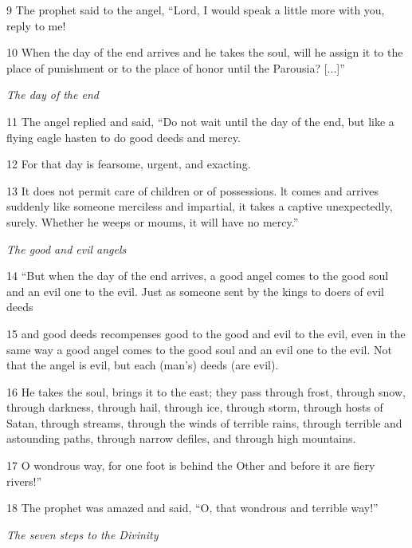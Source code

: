 \par 9 The prophet said to the angel, “Lord, I would speak a little more with you, reply to me!

\par 10 When the day of the end arrives and he takes the soul, will he assign it to the place of punishment or to the place of honor until the Parousia? [...]”

\par \textit{The day of the end}

\par 11 The angel replied and said, “Do not wait until the day of the end, but like a flying eagle hasten to do good deeds and mercy.

\par 12 For that day is fearsome, urgent, and exacting.

\par 13 It does not permit care of children or of possessions. lt comes and arrives suddenly like someone merciless and impartial, it takes a captive unexpectedly, surely. Whether he weeps or moums, it will have no mercy.”

\par \textit{The good and evil angels}

\par 14 “But when the day of the end arrives, a good angel comes to the good soul and an evil one to the evil. Just as someone sent by the kings to doers of evil deeds

\par 15 and good deeds recompenses good to the good and evil to the evil, even in the same way a good angel comes to the good soul and an evil one to the evil. Not that the angel is evil, but each (man's) deeds (are evil).

\par 16 He takes the soul, brings it to the east; they pass through frost, through snow, through darkness, through hail, through ice, through storm, through hosts of Satan, through streams, through the winds of terrible rains, through terrible and astounding paths, through narrow defiles, and through high mountains.

\par 17 O wondrous way, for one foot is behind the Other and before it are fiery rivers!”

\par 18 The prophet was amazed and said, “O, that wondrous and terrible way!”

\par \textit{The seven steps to the Divinity}

